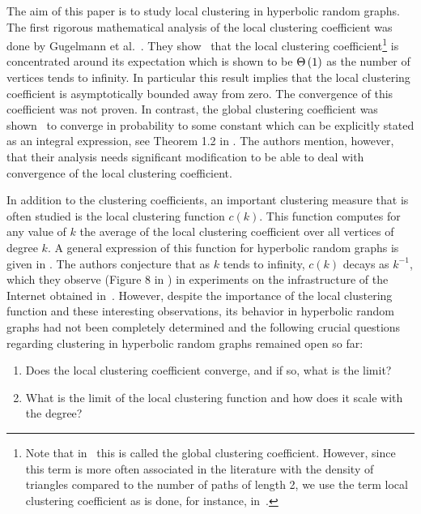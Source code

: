 The aim of this paper is to study local clustering in hyperbolic random graphs. The first rigorous mathematical analysis of the local clustering coefficient was done by Gugelmann et al.~\cite{gugelmann2012random}. They show~\cite[Theorem 2.1]{gugelmann2012random} that the local clustering coefficient\footnote{Note that in~\cite{gugelmann2012random} this is called the global clustering coefficient. However, since this term is more often associated in the literature with the density of triangles compared to the number of paths of length 2, we use the term local clustering coefficient as is done, for instance, in~\cite{candellero2016clustering}.} is concentrated around its expectation which is shown to be $\Theta\left(1\right)$ as the number of vertices tends to infinity. In particular this result implies that the local clustering coefficient is asymptotically bounded away from zero. The convergence of this coefficient was not proven. In contrast, the global clustering coefficient was shown~\cite{candellero2016clustering} to converge in probability to some constant which can be explicitly stated as an integral expression, see Theorem 1.2 in \cite{candellero2016clustering}. The authors mention, however, that their analysis needs significant modification to be able to deal with convergence of the local clustering coefficient.



In addition to the clustering coefficients, an important clustering measure that is often studied is the local clustering function $c(k)$. This function computes for any value of $k$ the average of the local clustering coefficient over all vertices of degree $k$. A general expression of this function for hyperbolic random graphs is given in \cite[Equation (59)]{krioukov2010hyperbolic}. The authors conjecture that as $k$ tends to infinity, $c(k)$ decays as $k^{-1}$, which they observe (Figure 8 in \cite{krioukov2010hyperbolic}) in experiments on the infrastructure of the Internet obtained in~\cite{claffy2009internet}. However, despite the importance of the local clustering function and these interesting observations, its behavior in hyperbolic random graphs had not been completely determined and the following crucial questions regarding clustering in hyperbolic random graphs remained open so far:
\begin{enumerate}[\upshape 1)]
\item Does the local clustering coefficient converge, and if so, what is the limit?
\item What is the limit of the local clustering function and how does it scale with the degree?
\end{enumerate}

